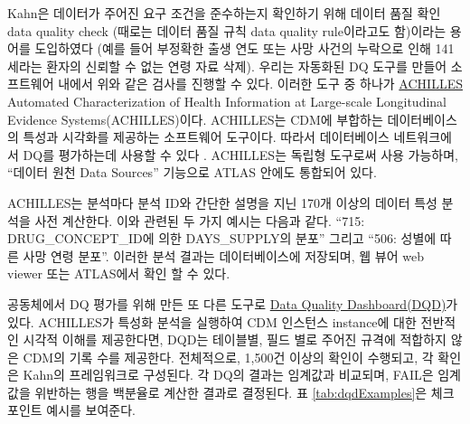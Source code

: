 \documentclass[10.5pt]{book}
\theoremstyle{definition}
\theoremstyle{definition}
\theoremstyle{definition}
\theoremstyle{remark}
\begin{document}
Kahn은 데이터가 주어진 요구 조건을 준수하는지 확인하기 위해 데이터 품질
확인 data quality check (때로는 데이터 품질 규칙 data quality
rule이라고도 함)이라는 용어를 도입하였다 (예를 들어 부정확한 출생 연도
또는 사망 사건의 누락으로 인해 141세라는 환자의 신뢰할 수 없는 연령 자료
삭제). 우리는 자동화된 DQ 도구를 만들어 소프트웨어 내에서 위와 같은
검사를 진행할 수 있다. 이러한 도구 중 하나가
\href{https://github.com/OHDSI/Achilles}{ACHILLES} Automated
Characterization of Health Information at Large-scale Longitudinal
Evidence Systems(ACHILLES)이다. \citep{huser_methods_2018} ACHILLES는
CDM에 부합하는 데이터베이스의 특성과 시각화를 제공하는 소프트웨어
도구이다. 따라서 데이터베이스 네트워크에서 DQ를 평가하는데 사용할 수
있다 \citep{huser_multisite_2016}. ACHILLES는 독립형 도구로써 사용
가능하며, ``데이터 원천 Data Sources'' 기능으로 ATLAS 안에도 통합되어
있다.  

ACHILLES는 분석마다 분석 ID와 간단한 설명을 지닌 170개 이상의 데이터
특성 분석을 사전 계산한다. 이와 관련된 두 가지 예시는 다음과 같다.
``715: DRUG\_CONCEPT\_ID에 의한 DAYS\_SUPPLY의 분포'' 그리고 ``506:
성별에 따른 사망 연령 분포''. 이러한 분석 결과는 데이터베이스에
저장되며, 웹 뷰어 web viewer 또는 ATLAS에서 확인 할 수 있다.


공동체에서 DQ 평가를 위해 만든 또 다른 도구로
\href{https://github.com/OHDSI/DataQualityDashboard}{Data Quality
Dashboard(DQD)}가 있다. ACHILLES가 특성화 분석을 실행하여 CDM 인스턴스
instance에 대한 전반적인 시각적 이해를 제공한다면, DQD는 테이블별, 필드
별로 주어진 규격에 적합하지 않은 CDM의 기록 수를 제공한다. 전체적으로,
1,500건 이상의 확인이 수행되고, 각 확인은 Kahn의 프레임워크로 구성된다.
각 DQ의 결과는 임계값과 비교되며, FAIL은 임계값을 위반하는 행을 백분율로
계산한 결과로 결정된다. 표 \ref{tab:dqdExamples}은 체크포인트 예시를
보여준다.
\end{document}
